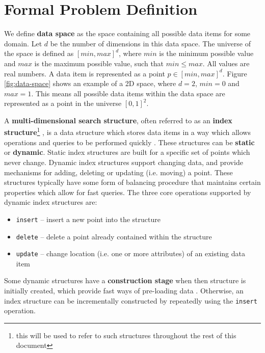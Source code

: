 \section{Formal Problem Definition}
\label{sec:definition}

We define \textbf{data space} as the space containing all possible data items for some domain. Let $d$ be the number of dimensions in this data space. The universe of the space is defined as $[min,max]^d$, where $min$ is the minimum possible value and $max$ is the maximum possible value, such that $min \leq max$. All values are real numbers. A data item is represented as a point $p \in [min,max]^d$. Figure \ref{fig:data-space} shows an example of a 2D space, where $d = 2$, $min = 0$ and $max = 1$. This means all possible data items within the data space are represented as a point in the universe $[0, 1]^2$.

A \textbf{multi-dimensional search structure}, often referred to as an \textbf{index structure}\footnote{this will be used to refer to such structures throughout the rest of this document} \cite{r-tree-variants}, is a data structure which stores data items in a way which allows operations and queries to be performed quickly \cite{dynamic-data-structures}. These structures can be \textbf{static} or \textbf{dynamic}. Static index structures are built for a specific set of points which never change. Dynamic index structures support changing data, and provide mechanisms for adding, deleting or updating (i.e. moving) a point. These structures typically have some form of balancing procedure \cite{dynamic-data-structures} that maintains certain properties which allow for fast queries. The three core operations supported by dynamic index structures are:
\begin{itemize}
	\item \texttt{insert} -- insert a new point into the structure
	\item \texttt{delete} -- delete a point already contained within the structure
	\item \texttt{update} -- change location (i.e. one or more attributes) of an existing data item
\end{itemize}
Some dynamic structures have a \textbf{construction stage} when then structure is initially created, which provide fast ways of pre-loading data \cite{pyramid-tree}. Otherwise, an index structure can be incrementally constructed by repeatedly using the \texttt{insert} operation.

